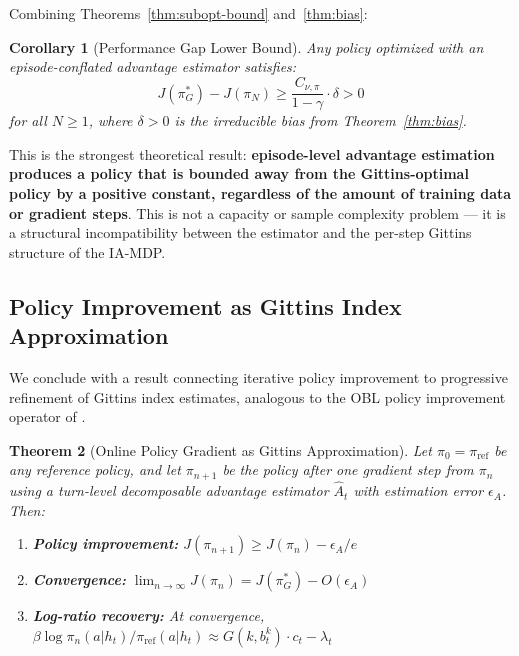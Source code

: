 \documentclass[11pt]{article}
\theoremstyle{plain}
\newtheorem{theorem}{Theorem}[section]
\newtheorem{corollary}[theorem]{Corollary}
\theoremstyle{definition}
\theoremstyle{remark}
\begin{document}
Combining Theorems~\ref{thm:subopt-bound} 
and~\ref{thm:bias}:

\begin{corollary}[Performance Gap Lower Bound]
\label{cor:gap-lower}
Any policy optimized with an episode-conflated advantage 
estimator satisfies:
$$J(\pi^*_G) - J(\pi_N) \geq 
\frac{C_{\nu,\pi}}{1-\gamma} \cdot \delta > 0$$
for all $N \geq 1$, where $\delta > 0$ is the 
irreducible bias from Theorem~\ref{thm:bias}.
\end{corollary}

This is the strongest theoretical result: \textbf{episode-level 
advantage estimation produces a policy that is bounded away 
from the Gittins-optimal policy by a positive constant, 
regardless of the amount of training data or gradient steps}. 
This is not a capacity or sample complexity problem — it is a 
structural incompatibility between the estimator and the 
per-step Gittins structure of the IA-MDP.

\subsection{Policy Improvement as Gittins Index Approximation}

We conclude with a result connecting iterative policy 
improvement to progressive refinement of Gittins index 
estimates, analogous to the OBL policy improvement operator 
of \citet{obel2021}.

\begin{theorem}[Online Policy Gradient as Gittins Approximation]
\label{thm:pg-gittins}
Let $\pi_0 = \pi_\mathrm{ref}$ be any reference policy, and 
let $\pi_{n+1}$ be the policy after one gradient step from 
$\pi_n$ using a turn-level decomposable advantage estimator 
$\hat{A}_t$ with estimation error $\epsilon_A$. Then:
\begin{enumerate}
    \item \textbf{Policy improvement:} 
          $J(\pi_{n+1}) \geq J(\pi_n) - \epsilon_A / e$
    \item \textbf{Convergence:} 
          $\lim_{n \to \infty} J(\pi_n) = J(\pi^*_G) - 
          O(\epsilon_A)$
    \item \textbf{Log-ratio recovery:} At convergence, 
          $\beta \log \pi_n(a|h_t) / \pi_\mathrm{ref}(a|h_t) 
          \approx G(k, b_t^k) \cdot c_t - \lambda_t$
\end{enumerate}
\end{theorem}
\end{document}
